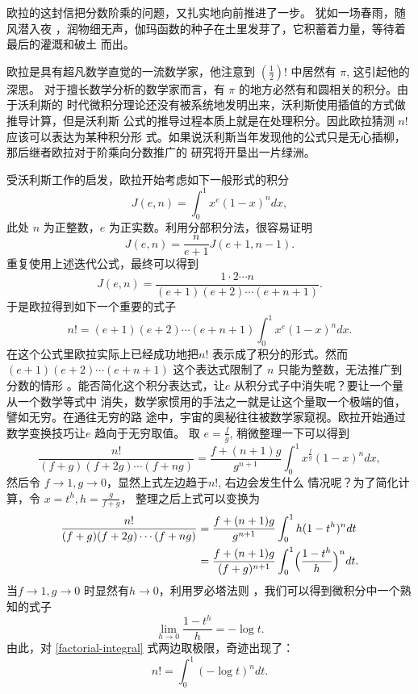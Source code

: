 {欧拉的这封信把分数阶乘的问题，又扎实地向前推进了一步。 犹如一场春雨，随风潜入夜
，润物细无声，伽玛函数的种子在土里发芽了，它积蓄着力量，等待着最后的灌溉和破土
而出。

欧拉是具有超凡数学直觉的一流数学家，他注意到 $ (\frac{1}{2})!$ 中居然有 $\pi$,
这引起他的深思。
对于擅长数学分析的数学家而言，有 $\pi$ 的地方必然有和圆相关的积分。由于沃利斯的
时代微积分理论还没有被系统地发明出来，沃利斯使用插值的方式做推导计算，但是沃利斯
公式的推导过程本质上就是在处理积分。因此欧拉猜测 $n!$ 应该可以表达为某种积分形
式。如果说沃利斯当年发现他的公式只是无心插柳，那后继者欧拉对于阶乘向分数推广的
研究将开垦出一片绿洲。 

受沃利斯工作的启发，欧拉开始考虑如下一般形式的积分
$$ J(e,n) = \int_0^1 x^e(1-x)^ndx ,$$
此处 $n$ 为正整数，$e$ 为正实数。利用分部积分法，很容易证明
$$ J(e,n) = \frac{n}{e+1}J(e+1,n-1) .$$
重复使用上述迭代公式，最终可以得到
$$ J(e,n) = \frac{1\cdot2\cdots n}{(e+1)(e+2)\cdots(e+n+1)} .$$
于是欧拉得到如下一个重要的式子
\begin{equation}
n! = (e+1)(e+2)\cdots(e+n+1)\int_0^1 x^e(1-x)^ndx .
\end{equation}
在这个公式里欧拉实际上已经成功地把$n!$ 表示成了积分的形式。然而
$(e+1)(e+2)\cdots(e+n+1)$ 这个表达式限制了 $n$ 只能为整数，无法推广到分数的情形
。能否简化这个积分表达式，让$e$ 从积分式子中消失呢？要让一个量从一个数学等式中
消失，数学家惯用的手法之一就是让这个量取一个极端的值，譬如无穷。在通往无穷的路
途中，宇宙的奥秘往往被数学家窥视。欧拉开始通过数学变换技巧让$e$ 趋向于无穷取值。
取
$e=\frac{f}{g}$, 稍微整理一下可以得到
$$ \frac{n!}{(f+g)(f+2g)\cdots(f+ng)} = \frac{f+(n+1)g}{g^{n+1}} \int_0^1 x^\frac{f}{g}(1-x)^n dx , $$
然后令 $f \rightarrow 1, g \rightarrow 0$，显然上式左边趋于$n!$, 右边会发生什么
情况呢？为了简化计算，令 $x=t^h, h=\frac{g}{f+g}$， 整理之后上式可以变换为
\begin{align}
\frac{n!}{(f+g)(f+2g)\cdots(f+ng)}
& = \frac{f+(n+1)g}{g^{n+1}} \int_0^1 h(1-t^h)^n dt  \notag \\
& = \frac{f+(n+1)g}{(f+g)^{n+1}} \int_0^1 \Bigl(\frac{1-t^h}{h}\Bigr)^n dt .
\label{factorial-integral}
\end{align}
当$f \rightarrow 1, g \rightarrow 0$ 时显然有$h \rightarrow 0$，利用罗必塔法则
，我们可以得到微积分中一个熟知的式子
$$ \lim_{h \rightarrow 0} \frac{1-t^h}{h} = -\log t .$$
由此，对 \eqref{factorial-integral} 式两边取极限，奇迹出现了：
\begin{equation}
\label{factorial-gamma-1}
n! = \int_0^1 (-\log t)^ndt .
\end{equation}
}
